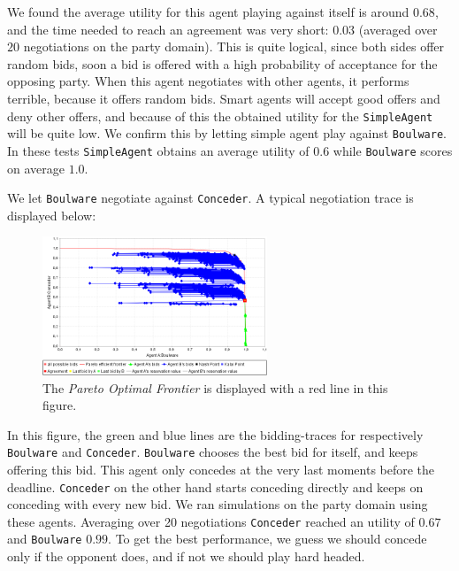 \documentclass[a4paper,10pt]{article}
\begin{document}
We found the average utility for this agent playing against itself is around $0.68$, and the time needed to reach an agreement was very short: $0.03$ (averaged over $20$ negotiations on the party domain).
This is quite logical, since both sides offer random bids, soon a bid is offered with a high probability of acceptance for the opposing party. When this agent negotiates with other agents, it performs terrible, because
it offers random bids. Smart agents will accept good offers and deny other offers,
and because of this the obtained utility for the \texttt{SimpleAgent} will be quite low.
We confirm this by letting simple agent play against \texttt{Boulware}. In these tests \texttt{SimpleAgent} obtains an average utility of $0.6$ while \texttt{Boulware} scores on average $1.0$. 

We let \texttt{Boulware} negotiate against \texttt{Conceder}. A typical negotiation trace is displayed below: \\

\begin{figure}[H]
\begin{center}
 \includegraphics[width=0.6\textwidth]{traceConcederBoulware.png}
 \caption{The \emph{Pareto Optimal Frontier} is displayed with a red line in this figure.}
 \label{fig:pareto} 
\end{center}
\end{figure}

In this figure, the green and blue lines are the bidding-traces for respectively \texttt{Boulware} and \texttt{Conceder}. \texttt{Boulware} chooses the best bid for itself, and keeps offering this bid. This agent only concedes at the very last moments before the deadline. \texttt{Conceder} on the other hand starts conceding directly and keeps on conceding with every new bid. We ran simulations on the party domain using these agents. Averaging over 20 negotiations \texttt{Conceder} reached an utility of $0.67$ and
\texttt{Boulware} $0.99$. To get the best performance, we guess we should concede only 
if the opponent does, and if not we should play hard headed.
 
\end{document}
